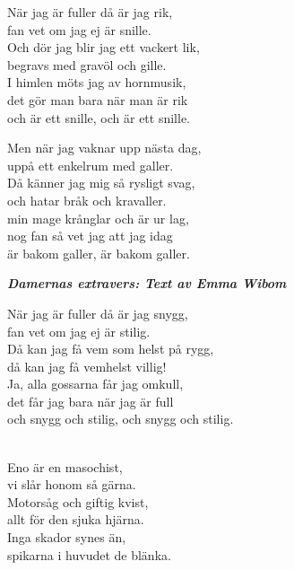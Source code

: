 {{När jag är fuller då är jag rik,\\
fan vet om jag ej är snille.\\
Och dör jag blir jag ett vackert lik,\\
begravs med gravöl och gille.\\
I himlen möts jag av hornmusik,\\
det gör man bara när man är rik\\
och är ett snille, och är ett snille.

\newpage 

Men när jag vaknar upp nästa dag,\\
uppå ett enkelrum med galler.\\
Då känner jag mig så rysligt svag,\\
och hatar bråk och kravaller.\\
min mage krånglar och är ur lag,\\
nog fan så vet jag att jag idag\\
är bakom galler, är bakom galler.


\textbf{\textit{Damernas extravers: Text av Emma Wibom}}

När jag är fuller då är jag snygg,\\
fan vet om jag ej är stilig.\\
Då kan jag få vem som helst på rygg,\\
då kan jag få vemhelst villig!\\
Ja, alla gossarna får jag omkull,\\
det får jag bara när jag är full\\
och snygg och stilig, och snygg och stilig.\\

 \\       

\songtext{}
Eno är en masochist,\\
vi slår honom så gärna.\\
Motorsåg och giftig kvist,\\
allt för den sjuka hjärna.\\
Inga skador synes än,\\
spikarna i huvudet de blänka.\\

 \\       

}}
